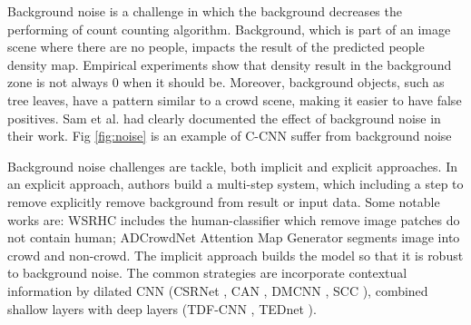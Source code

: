 Background noise is a challenge in which the background
decreases the performing of count counting algorithm.
Background, which is part of an image scene where there are
no people, impacts the result of the predicted people density
map. Empirical experiments show that density result in the
background zone is not always 0 when it should be. Moreover,
background objects, such as tree leaves, have a pattern similar
to a crowd scene, making it easier to have false positives. Sam et
al. \cite{DBLPconfaaaiSamB18} had clearly documented the effect of background noise in
their work. Fig \ref{fig:noise} is an example of C-CNN suffer from background noise

Background noise challenges are tackle, both implicit and explicit approaches. In an explicit approach, authors build a multi-step system, which including a step to remove explicitly remove background from result or input data. Some notable works are: WSRHC \cite{10.1145/3287921.3287980} includes the human-classifier which remove image patches do not contain human; ADCrowdNet \cite{liu2019adcrowdnet} Attention Map Generator segments image into crowd and non-crowd. The implicit approach builds the model so that it is robust to background noise. The common strategies are incorporate contextual information by dilated CNN (CSRNet \cite{li2018csrnet}, CAN \cite{liu2019context}, DMCNN \cite{zhang2019crowd}, SCC \cite{9023874}), combined shallow layers with deep layers (TDF-CNN \cite{DBLPconfaaaiSamB18}, TEDnet \cite{jiang2019crowd}).


